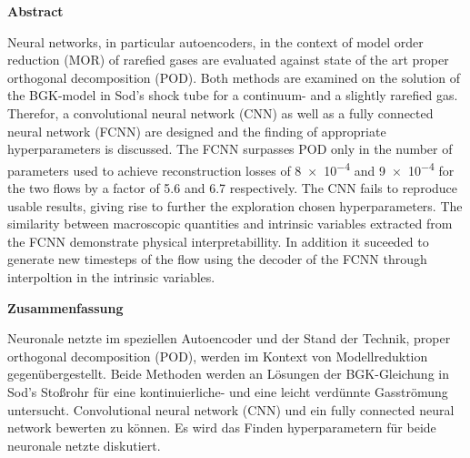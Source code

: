 

%
%
{
\pagestyle{empty}
\begin{center}
{\sffamily \bfseries\Large Abstract}\\
\end{center}%
\vspace{1cm}
%
Neural networks, in particular autoencoders, in the context of model order reduction (MOR) of rarefied gases are evaluated against state of the art proper orthogonal decomposition (POD). Both methods are examined on the solution of the BGK-model in Sod's shock tube for a continuum- and a slightly rarefied gas. Therefor, a convolutional neural network (CNN) as well as a fully connected neural network (FCNN) are designed and the finding of appropriate hyperparameters is discussed. The FCNN surpasses POD only in the number of parameters used to achieve reconstruction losses of \num{8e-4} and \num{9e-4} for the two flows by a factor of 5.6 and 6.7 respectively. The CNN fails to reproduce usable results, giving rise to further the exploration chosen hyperparameters. The similarity between macroscopic quantities and intrinsic variables extracted from the FCNN demonstrate physical interpretabillity. In addition it suceeded to generate new timesteps of the flow using the decoder of the FCNN through interpoltion in the intrinsic variables.         
\vspace{1.5cm}

%
\begin{center}
{\sffamily \bfseries\Large Zusammenfassung}\\
\end{center}%
\vspace{1cm}
%
Neuronale netzte im speziellen Autoencoder und der Stand der Technik, proper orthogonal decomposition (POD), werden im Kontext von Modellreduktion  gegenübergestellt. Beide Methoden werden an Lösungen der BGK-Gleichung in Sod's Stoßrohr für eine kontinuierliche- und eine leicht verdünnte Gasströmung untersucht. Convolutional neural network (CNN) und ein fully connected neural network bewerten zu können. Es wird das Finden hyperparametern für beide neuronale netzte diskutiert.   

\newpage
\pagestyle{plain}
}